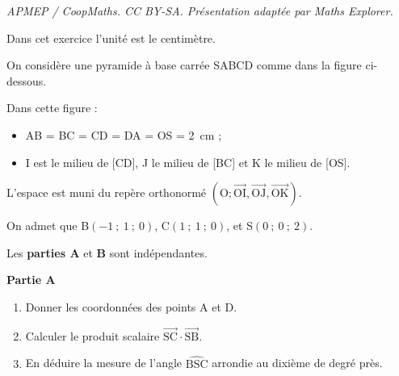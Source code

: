 \documentclass[10pt]{article}
\providecommand{\vectt}[1]{\overrightarrow{\mathrm{#1}}}
\begin{document}
\noindent\textit{APMEP / CoopMaths. CC BY-SA. Présentation adaptée par Maths Explorer.}\par\medskip
Dans cet exercice l'unité est le centimètre.

On considère une pyramide à base carrée SABCD comme dans la figure ci-dessous.

\begin{center}
\end{center}
















Dans cette figure :

\begin{itemize}
\item AB = BC = CD = DA = OS = 2~cm ;
\item I est le milieu de [CD], J le milieu de [BC] et K le milieu de [OS].
\end{itemize}

L'espace est muni du repère orthonormé $\left(\mathrm{O}; \vectt{OI}, \vectt{OJ}, \vectt{OK}\right)$.

On admet que B$(-1~;~1~;~0)$, C$(1~;~1~;~0)$, et S$(0~;~0~;~2)$.

\medskip

Les \textbf{parties A} et \textbf{B} sont indépendantes.

\textbf{Partie A}

\begin{enumerate}
\item Donner les coordonnées des points A et D.
\item Calculer le produit scalaire $\vectt{SC}\cdot\vectt{SB}$.
\item En déduire la mesure de l'angle $\widehat{\mathrm{BSC}}$ arrondie au dixième de degré près.
\end{enumerate}
\end{document}
